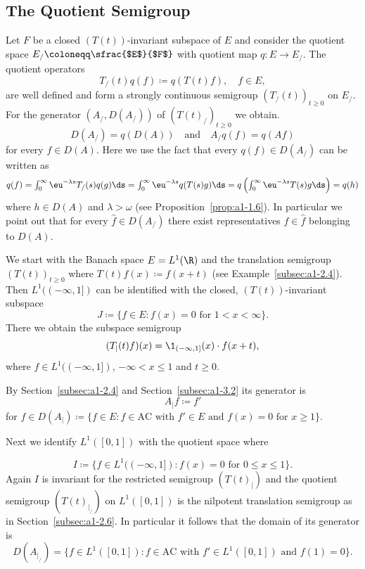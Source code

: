 \subsection{The Quotient Semigroup}\label{subsec:a1-3.4}%
Let $F$ be a closed $(T(t))$-invariant subspace of\/ $E$ and consider the quotient space 
$ E_{/} \coloneqq \sfrac{$E$}{$F$} $ 
with quotient map $q \colon E \to E_{/}$. 
The quotient operators
\[
    T_{/}(t)q(f) \coloneqq q(T(t)f), \quad f \in E,
\]
are well defined and form a strongly continuous semigroup $(T_{/}(t))_{t \geq 0}$ on $E_{/}$.
For the generator $(A_{/},D(A_{/}))$ of\/ $(T(t)_{/})_{t \geq 0}$ we obtain.
\[
    D(A_{/}) = q(D(A)) 
    \quad \text{and} \quad 
    A_{/}q(f) = q(Af)
\]
for every $f \in D(A)$.
Here we use the fact that every $q(f) \in D(A_{/})$ can be written as
\[\textstyle
    q(f) = \int_{0}^{\infty}  \eu^{-\lambda s} T_/(s)q(g)\ds 
    = \int_{0}^{\infty}  \eu^{-\lambda s}q(T(s)g) \ds 
    = q\left(\int_{0}^{\infty}  \eu^{-\lambda s}T(s)g \ds\right) = q(h)
\]
where $h \in D(A)$ and $\lambda > \omega$ (see Proposition~\ref{prop:a1-1.6}).
In particular we point out that for every $\hat{f} \in D(A_{/})$ there exist representatives $f \in \hat{f}$ belonging to $D(A)$.
\begin{example*}\label{ex:a1-3.1}%
We start with the Banach space $E = L^{1}(\R)$ and the translation semigroup $(T(t))_{t \geq 0}$ where $T(t)f(x) \coloneqq f(x+t)$ (see Example~\ref{subsec:a1-2.4}).
Then $L^{1}((-\infty,1])$ can be identified with the closed, $(T(t))$-invariant subspace
\[
    J \coloneqq \{f \in E \colon f(x) = 0 \text{ for } 1 < x < \infty\} .
\]
There we obtain the subspace semigroup
\[
    (T_{|}(t)f)(x) = \1_{(-\infty,1]}(x) \cdot f(x+t),
\]
where $f \in L^{1}((-\infty,1])$, $-\infty < x \leq 1$ and $t \geq 0$.

By Section~\ref{subsec:a1-2.4} and Section~\ref{subsec:a1-3.2} its generator is
\[
    A_{|}f \coloneqq f'
\]
for $f \in D(A_{|}) \coloneqq \{f \in E \colon f \in \text{AC} \text{ with } f' \in E \text{ and } f(x) = 0 \text{ for } x \geq 1\}$.

Next we identify $L^{1}(\left[ 0,1 \right])$ with the quotient space \sfrac{$L^{1}((-\infty,1])$}{$I$} where

\[
    I \coloneqq \{f \in L^{1}((-\infty,1]) \colon f(x) = 0 \text{ for } 0 \leq x \leq 1\} .
\]
Again $I$ is invariant for the restricted semigroup $(T(t)_{|})$ and the
quotient semigroup $(T(t)_{\vert _{/}})$ on $L^{1}(\left[ 0,1 \right])$ is the nilpotent translation semigroup as in Section~\ref{subsec:a1-2.6}.
In particular it follows that the domain of its generator is
\[
    D(A_{|_{/}}) = \{f \in L^{1}(\left[ 0,1 \right]) \colon f \in \text{AC} \text{ with } f' \in L^{1}(\left[ 0,1 \right]) \text{ and } f(1) = 0\}.
\]
\end{example*}

